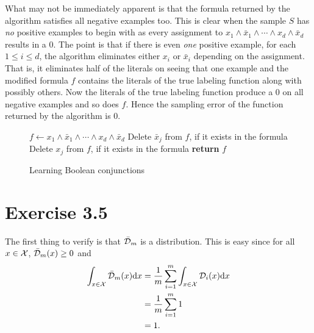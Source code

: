 What may not be immediately apparent is that the formula returned by the
algorithm satisfies all negative examples too. This is clear when the sample
$S$ has \emph{no} positive examples to begin with as every assignment to $x_1
\land \bar{x}_1 \land \cdots \land x_d \land \bar{x}_d$ results in a $0$. The
point is that if there is even \emph{one} positive example, for each $1 \leq i
\leq d$, the algorithm eliminates either $x_i$ or $\bar{x}_i$ depending on the
assignment. That is, it eliminates half of the literals on seeing that one
example and the modified formula $f$ contains the literals of the true labeling
function along with possibly others.  Now the literals of the true labeling
function produce a $0$ on all negative examples and so does $f$. Hence the
sampling error of the function returned by the algorithm is $0$.   
\begin{figure}
    \begin{algorithmic}[0] %
            \State $f \gets x_1 \land \bar{x}_1 \land \cdots 
            \land x_d \land \bar{x}_d$
            			\State Delete $\bar{x}_j$ from $f$, if it exists in the formula
            		\Else
            			\State Delete $x_j$ from $f$, if it exists in the formula
            		\EndIf
             	\EndFor
            \EndFor
            \State \textbf{return} $f$
        \EndProcedure
    \end{algorithmic}
\caption{Learning Boolean conjunctions}
\label{fig:pac_boolean_conjunctions}
\end{figure}


\section*{Exercise 3.5}

The first thing to verify is that $\bar{\mathcal{D}}_m$ is a distribution. This is
easy since for all $x \in \mathcal{X}$, $\bar{\mathcal{D}}_m(x) \geq 0$ and 
\begin{align*}
	\int_{x \in \mathcal{X}} \bar{\mathcal{D}}_m (x) \text{d} x & = \frac{1}{m} \sum_{i = 1}^m  
	\int_{x \in \mathcal{X}} \mathcal{D}_i (x) \text{d} x \\
	& = \frac{1}{m} \sum_{i = 1}^m 1 \\
	& = 1.
\end{align*}

